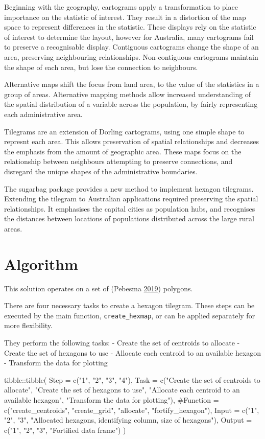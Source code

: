 Beginning with the geography, cartograms apply a transformation to place
importance on the statistic of interest. They result in a distortion of
the map space to represent differences in the statistic. These displays
rely on the statistic of interest to determine the layout, however for
Australia, many cartograms fail to preserve a recognisable display.
Contiguous cartograms change the shape of an area, preserving
neighbouring relationships. Non-contiguous cartograms maintain the shape
of each area, but lose the connection to neighbours.

Alternative maps shift the focus from land area, to the value of the
statistics in a group of areas. Alternative mapping methods allow
increased understanding of the spatial distribution of a variable across
the population, by fairly representing each administrative area.

Tilegrams are an extension of Dorling cartograms, using one simple shape
to represnt each area. This allows preservation of spatial relationships
and decreases the emphasis from the amount of geographic area. These
maps focus on the relationship between neighbours attempting to preserve
connections, and disregard the unique shapes of the administrative
boundaries.

The sugarbag package provides a new method to implement hexagon
tilegrams. Extending the tilegram to Australian applications required
preserving the spatial relationships. It emphasises the capital cities
as population hubs, and recognises the distances between locations of
populations distributed across the large rural areas.

\hypertarget{algorithm}{%
\section{Algorithm}\label{algorithm}}

This solution operates on a set of  (Pebesma
\protect\hyperlink{ref-sf}{2019}) polygons.

There are four necessary tasks to create a hexagon tilegram. These steps
can be executed by the main function, \texttt{create\_hexmap}, or can be
applied separately for more flexibility.

They perform the following tasks: - Create the set of centroids to
allocate - Create the set of hexagons to use - Allocate each centroid to
an available hexagon - Transform the data for plotting

\begin{Schunk}
\begin{Sinput}
tibble::tibble(
  Step = c("1", "2", "3", "4"),
  Task = c("Create the set of centroids to allocate",
    "Create the set of hexagons to use", 
    "Allocate each centroid to an available hexagon",
    "Transform the data for plotting"),
  #Function = c("create_centroids", "create_grid", "allocate", "fortify_hexagon"),
  Input = 
    c("1", "2", "3",
    "Allocated hexagons, identifying column, size of hexagons"),
  Output = c("1", "2", "3", "Fortified data frame")
  )
\end{Sinput}
\end{Schunk}

